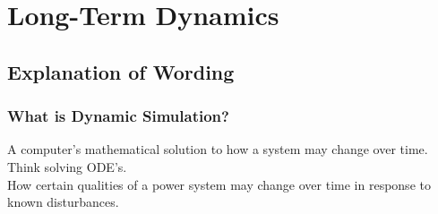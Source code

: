 \documentclass[14pt, unknownkeysallowed]{beamer}
\begin{document}
\section{Long-Term Dynamics}
\subsection{Explanation of Wording}
\begin{frame}
\frametitle{What is Dynamic Simulation?}
A computer's mathematical solution to how a system may change over time.\\%
\vspace{1em}
Think solving ODE's.\\
\vspace{1em}
How certain qualities of a power system may change over time in response to known disturbances.
\end{frame}
\end{document}
